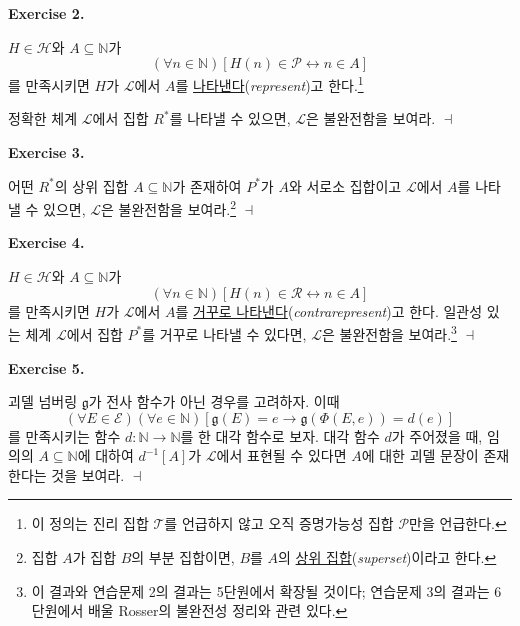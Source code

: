 \documentclass[12pt]{paper}
\newcommand{\gnum}
{ \mathfrak{g}
}
\newenvironment{context}[1][]
{ \noindent \textbf{{#1}.}
}
{ \hfill $ \dashv $
}
\begin{document}
  \begin{context}[Exercise 2]
    $H \in \mathcal{H}$와 $A \subseteq \mathbb{N}$가
    $$ \left( \forall n \in \mathbb{N} \right) \left[ H \left( n \right) \in \mathcal{P} \leftrightarrow n \in A \right] $$를 만족시키면
    $H$가 $\mathcal{L}$에서 $A$를 \underline{나타낸다}(\textit{represent})고 한다.\footnote
    {
      이 정의는 진리 집합 $\mathcal{T}$를 언급하지 않고 오직 증명가능성 집합 $\mathcal{P}$만을 언급한다.
    }

    정확한 체계 $\mathcal{L}$에서 집합 $R^{*}$를 나타낼 수 있으면, $\mathcal{L}$은 불완전함을 보여라.
  \end{context}

  \begin{context}[Exercise 3]
    어떤 $R^{*}$의 상위 집합 $A \subseteq \mathbb{N}$가 존재하여 $P^{*}$가 $A$와 서로소 집합이고 $\mathcal{L}$에서 $A$를 나타낼 수 있으면,
    $\mathcal{L}$은 불완전함을 보여라.\footnote
    {
      집합 $A$가 집합 $B$의 부분 집합이면, $B$를 $A$의 \underline{상위 집합}(\textit{superset})이라고 한다.
    }
  \end{context}

  \begin{context}[Exercise 4]
    $H \in \mathcal{H}$와 $A \subseteq \mathbb{N}$가
    $$ \left( \forall n \in \mathbb{N} \right) \left[ H \left( n \right) \in \mathcal{R} \leftrightarrow n \in A \right] $$를 만족시키면
    $H$가 $\mathcal{L}$에서 $A$를 \underline{거꾸로 나타낸다}(\textit{contrarepresent})고 한다.
    일관성 있는 체계 $\mathcal{L}$에서 집합 $P^{*}$를 거꾸로 나타낼 수 있다면,
    $\mathcal{L}$은 불완전함을 보여라.\footnote
    {
      이 결과와 연습문제 2의 결과는 5단원에서 확장될 것이다;
      연습문제 3의 결과는 6단원에서 배울 Rosser의 불완전성 정리와 관련 있다.
    }
  \end{context}

  \begin{context}[Exercise 5]
    괴델 넘버링 $\gnum$가 전사 함수가 아닌 경우를 고려하자.
    이때 $$ \left( \forall E \in \mathcal{E} \right) \left( \forall e \in \mathbb{N} \right) \left[ \gnum \left( E \right) = e \rightarrow \gnum \left( \Phi \left( E , e \right) \right) = d \left( e \right) \right] $$를
    만족시키는 함수 $d : \mathbb{N} \to \mathbb{N}$를 한 대각 함수로 보자.
    대각 함수 $d$가 주어졌을 때, 임의의 $A \subseteq \mathbb{N}$에 대하여 $d^{-1} \left[ A \right]$가 $\mathcal{L}$에서 표현될 수 있다면 $A$에 대한 괴델 문장이 존재한다는 것을 보여라.
  \end{context}
\end{document}
